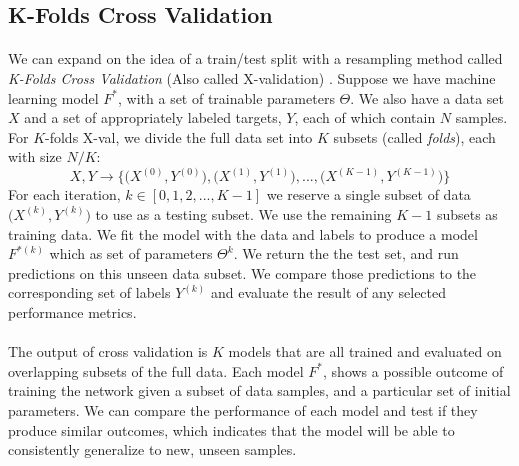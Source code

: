 \documentclass[12pt,letterpaper]{article}
\begin{document}

\subsection{K-Folds Cross Validation}
\label{subsec-XValidation}

\paragraph*{}We can expand on the idea of a train/test split with a resampling method called \textit{K-Folds Cross Validation} (Also called X-validation) \cite{Geron,James}. Suppose we have machine learning model $F^*$, with a set of trainable parameters $\Theta$. We also have a data set $X$ and a set of appropriately labeled targets, $Y$, each of which contain $N$ samples. For $K$-folds X-val, we divide the full data set into $K$ subsets (called \textit{folds}), each with size $N/K$:
\begin{equation}
\label{eqn-XValSplit}
X,Y \rightarrow \Big\{ \big(X^{(0)},Y^{(0)}\big) , \big(X^{(1)},Y^{(1)}\big) , ... , \big(X^{(K-1)},Y^{(K-1)}\big) \Big\}
\end{equation}
For each iteration, $k \in [0,1,2,...,K-1]$ we reserve a single subset of data $\big(X^{(k)},Y^{(k)}\big)$ to use as a testing subset. We use the remaining $K-1$ subsets as training data. We fit the model with the data and labels to produce a model $F^{*(k)}$ which as set of parameters $\Theta^{k}$. We return the the test set, and run predictions on this unseen data subset. We compare those predictions to the corresponding set of labels $Y^{(k)}$ and evaluate the result of any selected performance metrics.

\paragraph*{}The output of cross validation is $K$ models that are all trained and evaluated on overlapping subsets of the full data. Each model $F^*$, shows a possible outcome of training the network given a subset of data samples, and a particular set of initial parameters. We can compare the performance of each model and test if they produce similar outcomes, which indicates that the model will be able to consistently generalize to new, unseen samples.
\end{document}
